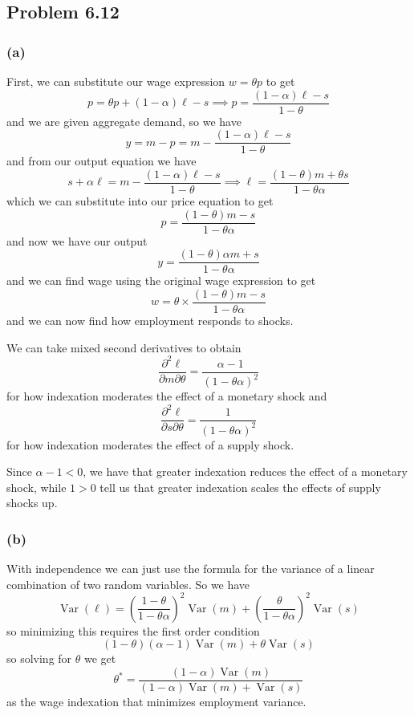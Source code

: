 \documentclass[11pt]{amsart}
\begin{document}
\subsection{Problem 6.12}

\subsubsection*{(a)}
First, we can substitute our wage expression $w = \theta p$ to get
\[
p = \theta p + (1-\alpha) \ell - s \implies p = \frac{(1-\alpha) \ell - s}{1-\theta}
\]
and we are given aggregate demand, so we have
\[
y = m - p = m - \frac{(1-\alpha) \ell - s}{1-\theta}
\]
and from our output equation we have
\[
s + \alpha \ell = m - \frac{(1-\alpha) \ell - s}{1-\theta} \implies \ell = \frac{(1-\theta) m + \theta s}{1-\theta \alpha}
\]
which we can substitute into our price equation to get
\[
p = \frac{(1-\theta) m - s}{1-\theta \alpha}
\]
and now we have our output
\[
y = \frac{(1-\theta) \alpha m + s}{1-\theta \alpha}
\]
and we can find wage using the original wage expression to get
\[
w = \theta \times \frac{(1-\theta) m - s}{1-\theta \alpha}
\]
and we can now find how employment responds to shocks.

We can take mixed second derivatives to obtain
\[
\frac{\partial^2 \ell}{\partial m \partial \theta} = \frac{\alpha - 1}{(1-\theta \alpha)^2}
\]
for how indexation moderates the effect of a monetary shock and
\[
\frac{\partial^2 \ell}{\partial s \partial \theta} = \frac{1}{(1-\theta \alpha)^2}
\]
for how indexation moderates the effect of a supply shock.

Since $\alpha - 1 < 0$, we have that greater indexation reduces the effect of a monetary shock, while $1 > 0$ tell us that greater indexation scales the effects of supply shocks up.

\subsubsection*{(b)}

With independence we can just use the formula for the variance of a linear combination of two random variables. So we have
\[
\operatorname{Var}(\ell) = \left(\frac{1-\theta}{1-\theta \alpha}\right)^2 \operatorname{Var}(m) + \left(\frac{\theta}{1-\theta \alpha}\right)^2 \operatorname{Var}(s)
\]
so minimizing this requires the first order condition
\[
(1-\theta)(\alpha-1) \operatorname{Var}(m) + \theta \operatorname{Var}(s)
\]
so solving for $\theta$ we get
\[
\theta^* = \frac{(1-\alpha) \operatorname{Var}(m)}{(1-\alpha) \operatorname{Var}(m) + \operatorname{Var}(s)}
\]
as the wage indexation that minimizes employment variance.
\end{document}
